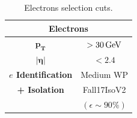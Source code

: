 \begin{minipage}{\linewidth}
\begin{minipage}{0.46\linewidth}
        \begin{table}[H]
            \centering
            \renewcommand{\arraystretch}{1.48}
            \begin{tabular}{c|c}
                \toprule
                \multicolumn{2}{c}{\textbf{Electrons}}\\
                \midrule
                \midrule
                $\mathbf{p_T}$& $>30 {\,\text{Ge\hspace{-.08em}V}}$\\
                \midrule
                $\bm{|\eta|}$& $<2.4$ \\
                \midrule
                \textbf{$e$ Identification}&Medium WP\\
                \textbf{+ Isolation}&Fall17IsoV2 \\
                &$(\epsilon \sim 90\%)$\\
                \bottomrule
            \end{tabular}
            \caption{Electrons selection cuts.}
        \end{table}      
    \end{minipage}
\end{minipage}

 
\newpage
